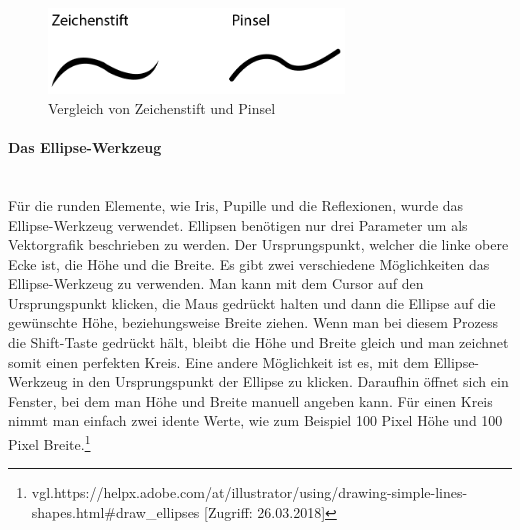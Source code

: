 \begin{figure}[H] 
  \centering
     \includegraphics[width=0.7\textwidth]{design_abb2.png}
  \caption{Vergleich von Zeichenstift und Pinsel}
\end{figure}

\paragraph{Das Ellipse-Werkzeug}
\leavevmode \\
Für die runden Elemente, wie Iris, Pupille und die Reflexionen, wurde das Ellipse-Werkzeug verwendet. Ellipsen benötigen nur drei Parameter um als Vektorgrafik beschrieben zu werden. Der Ursprungspunkt, welcher die linke obere Ecke ist, die Höhe und die Breite. Es gibt zwei verschiedene Möglichkeiten das Ellipse-Werkzeug zu verwenden. Man kann mit dem Cursor auf den Ursprungspunkt klicken, die Maus gedrückt halten und dann die Ellipse auf die gewünschte Höhe, beziehungsweise Breite ziehen. Wenn man bei diesem Prozess die Shift-Taste gedrückt hält, bleibt die Höhe und Breite gleich und man zeichnet somit einen perfekten Kreis. Eine andere Möglichkeit ist es, mit dem Ellipse-Werkzeug in den Ursprungspunkt der Ellipse zu klicken. Daraufhin öffnet sich ein Fenster, bei dem man Höhe und Breite manuell angeben kann. Für einen Kreis nimmt man einfach zwei idente Werte, wie zum Beispiel 100 Pixel Höhe und 100 Pixel Breite.\footnote{\label{} vgl.https://helpx.adobe.com/at/illustrator/using/drawing-simple-lines-shapes.html\#draw\_ellipses [Zugriff: 26.03.2018]}
\leavevmode \\

